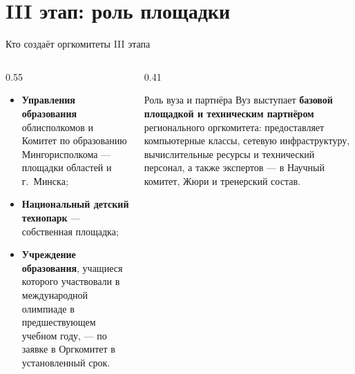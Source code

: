 \section{III этап: роль площадки}

\begin{frame}{Кто создаёт оргкомитеты III этапа}
  \vspace{0.3em}
  \begin{columns}[T]
    \begin{column}{0.55\textwidth}
      \begin{itemize}\setlength\itemsep{0.55em}
        \item \textbf{Управления образования} облисполкомов и Комитет по
              образованию Мингорисполкома --- площадки областей и г.~Минска;
        \item \textbf{Национальный детский технопарк} --- собственная площадка;
        \item \textbf{Учреждение образования}, учащиеся которого участвовали
              в международной олимпиаде в предшествующем учебном году, ---
              по заявке в Оргкомитет в установленный срок.
      \end{itemize}
    \end{column}
    \begin{column}{0.41\textwidth}
      \begin{block}{Роль вуза и партнёра}
        Вуз выступает \textbf{базовой площадкой и техническим партнёром}
        регионального оргкомитета: предоставляет компьютерные классы,
        сетевую инфраструктуру, вычислительные ресурсы и технический персонал,
        а также экспертов --- в Научный комитет, Жюри и тренерский состав.
      \end{block}
    \end{column}
  \end{columns}
\end{frame}
